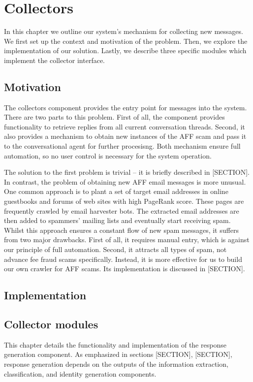 \chapter{Collectors}

In this chapter we outline our system's mechanism for collecting new messages. We first set up the context and motivation of the problem. Then, we explore the implementation of our solution. Lastly, we describe three specific modules which implement the collector interface.

\section{Motivation}

The collectors component provides the entry point for messages into the system. There are two parts to this problem. First of all, the component provides functionality to retrieve replies from all current conversation threads. Second, it also provides a mechanism to obtain new instances of the AFF scam and pass it to the conversational agent for further procesisng. Both mechanism ensure full automation, so no user control is necessary for the system operation.

The solution to the first problem is trivial -- it is briefly described in [SECTION]. In contrast, the problem of obtaining new AFF email messages is more unusual. One common approach is to plant a set of target email addresses in online guestbooks and forums of web sites with high PageRank score. These pages are frequently crawled by email harvester bots. The extracted email addresses are then added to spammers' mailing lists and eventually start receiving spam. Whilst this approach ensures a constant flow of new spam messages, it suffers from two major drawbacks. First of all, it requires manual entry, which is against our principle of full automation. Second, it attracts all types of spam, not advance fee fraud scams specifically. Instead, it is more effective for us to build our own crawler for AFF scams. Its implementation is discussed in [SECTION].

\section{Implementation}
\section{Collector modules}


This chapter details the functionality and implementation of the response generation component. As emphasized in sections [SECTION], [SECTION], response generation depends on the outputs of the information extraction, classification, and identity generation components. 

